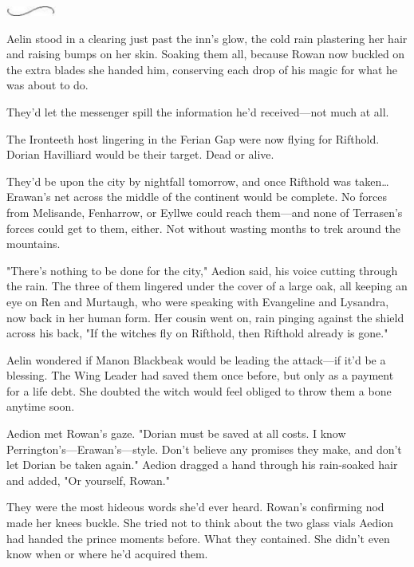 \begin{center}
    \includegraphics[width=0.65in,height=0.13in]{images/seperator}
\end{center}

Aelin stood in a clearing just past the inn's glow, the cold rain plastering her hair and raising bumps on her skin.
Soaking them all, because Rowan now buckled on the extra blades she handed him, conserving each drop of his magic for what he was about to do.

They'd let the messenger spill the information he'd received---not much at all.

The Ironteeth host lingering in the Ferian Gap were now flying for Rifthold.
Dorian Havilliard would be their target.
Dead or alive.

They'd be upon the city by nightfall tomorrow, and once Rifthold was taken\ldots Erawan's net across the middle of the continent would be complete.
No forces from Melisande, Fenharrow, or Eyllwe could reach them---and none of Terrasen's forces could get to them, either.
Not without wasting months to trek around the mountains.

"There's nothing to be done for the city," Aedion said, his voice cutting through the rain.
The three of them lingered under the cover of a large oak, all keeping an eye on Ren and Murtaugh, who were speaking with Evangeline and Lysandra, now back in her human form.
Her cousin went on, rain pinging against the shield across his back, "If the witches fly on Rifthold, then Rifthold already is gone."

Aelin wondered if Manon Blackbeak would be leading the attack---if it'd be a blessing.
The Wing Leader had saved them once before, but only as a payment for a life debt.
She doubted the witch would feel obliged to throw them a bone anytime soon.

Aedion met Rowan's gaze.
"Dorian must be saved at all costs.
I know Perrington's---Erawan's---style.
Don't believe any promises they make, and don't let Dorian be taken again."
Aedion dragged a hand through his rain-soaked hair and added, "Or yourself, Rowan."

They were the most hideous words she'd ever heard.
Rowan's confirming nod made her knees buckle.
She tried not to think about the two glass vials Aedion had handed the prince moments before.
What they contained.
She didn't even know when or where he'd acquired them.

